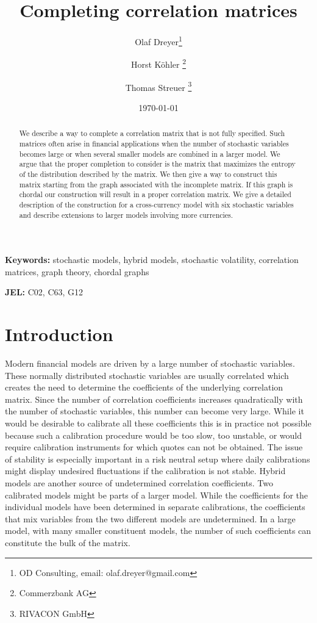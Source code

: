 \documentclass[11pt, a4paper]{article}
\begin{document}
\title{Completing correlation matrices}

\author{Olaf Dreyer\thanks{OD Consulting, email: olaf.dreyer@gmail.com}
\and Horst K\"ohler \thanks{Commerzbank AG}
\and Thomas Streuer \thanks{RIVACON GmbH} }

\date{\today}

\maketitle

\begin{abstract}
	We describe a way to complete a correlation matrix that is not fully specified. Such matrices often arise in financial applications when the number of stochastic variables becomes large or when several smaller models are combined in a larger model. We argue that the proper completion to consider is the matrix that maximizes the entropy of the distribution described by the matrix. We then give a way to construct this matrix starting from the graph associated with the incomplete matrix. If this graph is chordal our construction will result in a proper correlation matrix. We give a detailed description of the construction for a cross-currency model with six stochastic variables and describe extensions to larger models involving more currencies.
\end{abstract}

\textbf{Keywords:} stochastic models, hybrid models, stochastic volatility, correlation matrices, graph theory, chordal graphs

\textbf{JEL:} C02, C63, G12

\section{Introduction}
Modern financial models are driven by a large number of stochastic variables. These normally distributed stochastic variables are usually correlated which creates the need to determine the coefficients of the underlying correlation matrix. Since the number of correlation coefficients increases quadratically with the number of stochastic variables, this number can become very large. While it would be desirable to calibrate all these coefficients this is in practice not possible because such a calibration procedure would be too slow, too unstable, or would require calibration instruments for which quotes can not be obtained. The issue of stability is especially important in a risk neutral setup where daily calibrations might display undesired fluctuations if the calibration is not stable. Hybrid models are another source of undetermined correlation coefficients. Two calibrated models might be parts of a larger model. While the coefficients for the individual models have been determined in separate calibrations, the coefficients that mix variables from the two different models are undetermined. In a large model, with many smaller constituent models, the number of such coefficients can constitute the bulk of the matrix. 
\end{document}
